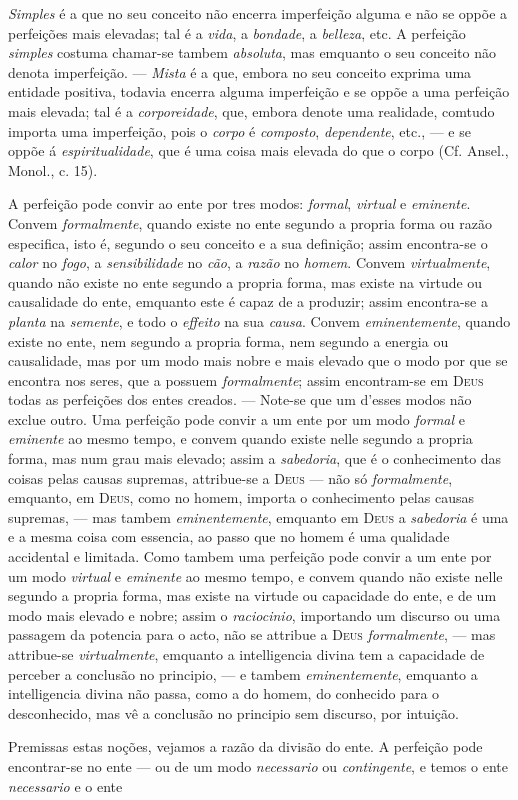 \emph{Simples} é a que no seu conceito não encerra imperfeição alguma e não se oppõe a perfeições mais elevadas; tal é a \emph{vida}, a \emph{bondade}, a \emph{belleza}, etc. A perfeição \emph{simples} costuma chamar-se tambem \emph{absoluta}, mas emquanto o seu conceito não denota imperfeição. --- \emph{Mista} é a que, embora no seu conceito exprima uma entidade positiva, todavia encerra alguma imperfeição e se oppõe a uma perfeição mais elevada; tal é a \emph{corporeidade}, que, embora denote uma realidade, comtudo importa uma imperfeição, pois o \emph{corpo} é \emph{composto}, \emph{dependente}, etc., --- e se oppõe á \emph{espiritualidade}, que é uma coisa mais elevada do que o corpo (Cf. Ansel., Monol., c. 15).\par A perfeição pode convir ao ente por tres modos: \emph{formal}, \emph{virtual} e \emph{eminente}. Convem \emph{formalmente}, quando existe no ente segundo a propria forma ou razão especifica, isto é, segundo o seu conceito e a sua definição; assim encontra-se o \emph{calor} no \emph{fogo}, a \emph{sensibilidade} no \emph{cão}, a \emph{razão} no \emph{homem}. Convem \emph{virtualmente}, quando não existe no ente segundo a propria forma, mas existe na virtude ou causalidade do ente, emquanto este é capaz de a produzir; assim encontra-se a \emph{planta} na \emph{semente}, e todo o \emph{effeito} na sua \emph{causa}. Convem \emph{eminentemente}, quando existe no ente, nem segundo a propria forma, nem segundo a energia ou causalidade, mas por um modo mais nobre e mais elevado que o modo por que se encontra nos seres, que a possuem \emph{formalmente}; assim encontram-se em \textsc{Deus} todas as perfeições dos entes creados. --- Note-se que um d'esses modos não exclue outro. Uma perfeição pode convir a um ente por um modo \emph{formal} e \emph{eminente} ao mesmo tempo, e convem quando existe nelle segundo a propria forma, mas num grau mais elevado; assim a \emph{sabedoria}, que é o conhecimento das coisas pelas causas supremas, attribue-se a \textsc{Deus} --- não só \emph{formalmente}, emquanto, em \textsc{Deus}, como no homem, importa o conhecimento pelas causas supremas, --- mas tambem \emph{eminentemente}, emquanto em \textsc{Deus} a \emph{sabedoria} é uma e a mesma coisa com essencia, ao passo que no homem é uma qualidade accidental e limitada. Como tambem uma perfeição pode convir a um ente por um modo \emph{virtual} e \emph{eminente} ao mesmo tempo, e convem quando não existe nelle segundo a propria forma, mas existe na virtude ou capacidade do ente, e de um modo mais elevado e nobre; assim o \emph{raciocinio}, importando um discurso ou uma passagem da potencia para o acto, não se attribue a \textsc{Deus} \emph{formalmente}, --- mas attribue-se \emph{virtualmente}, emquanto a intelligencia divina tem a capacidade de perceber a conclusão no principio, --- e tambem \emph{eminentemente}, emquanto a intelligencia divina não passa, como a do homem, do conhecido para o desconhecido, mas vê a conclusão no principio sem discurso, por intuição.\par Premissas estas noções, vejamos a razão da divisão do ente. A perfeição pode encontrar-se no ente --- ou de um modo \emph{necessario} ou \emph{contingente}, e temos o ente \emph{necessario} e o ente 
